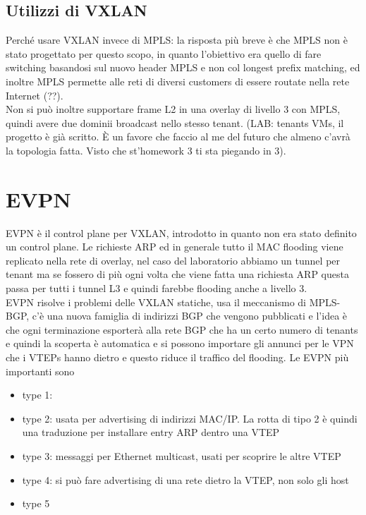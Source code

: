 \documentclass[12pt, oneside]{extbook} %
\begin{document}
\subsection{Utilizzi di VXLAN}
Perché usare VXLAN invece di MPLS: la risposta più breve è che MPLS non è stato progettato per questo scopo, in quanto l'obiettivo era quello di fare switching basandosi sul nuovo header MPLS e non col longest prefix matching, ed inoltre MPLS permette alle reti di diversi customers di essere routate nella rete Internet (??).\\Non si può inoltre supportare frame L2 in una overlay di livello 3 con MPLS, quindi avere due dominii broadcast nello stesso tenant. (LAB: tenants VMs, il progetto è già scritto. È un favore che faccio al me del futuro che almeno c'avrà la topologia fatta. Visto che st'homework 3 ti sta piegando in 3).
\section{EVPN}
EVPN è il control plane per VXLAN, introdotto in quanto non era stato definito un control plane. Le richieste ARP ed in generale tutto il MAC flooding viene replicato nella rete di overlay, nel caso del laboratorio abbiamo un tunnel per tenant ma se fossero di più ogni volta che viene fatta una richiesta ARP questa passa per tutti i tunnel L3 e quindi farebbe flooding anche a livello 3.\\EVPN risolve i problemi delle VXLAN statiche, usa il meccanismo di MPLS-BGP, c'è una nuova famiglia di indirizzi BGP che vengono pubblicati e l'idea è che ogni terminazione esporterà alla rete BGP che ha un certo numero di tenants e quindi la scoperta è automatica e si possono importare gli annunci per le VPN che i VTEPs hanno dietro e questo riduce il traffico del flooding. Le EVPN più importanti sono
\begin{itemize}
\item type 1:
\item type 2: usata per advertising di indirizzi MAC/IP. La rotta di tipo 2 è quindi una traduzione per installare entry ARP dentro una VTEP 
\item type 3: messaggi per Ethernet multicast, usati per scoprire le altre VTEP
\item type 4: si può fare advertising di una rete dietro la VTEP, non solo gli host
\item type 5
\end{itemize}
\end{document}
